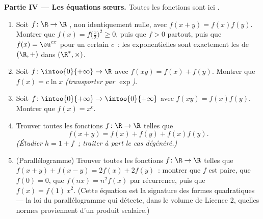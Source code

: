 \begin{problem}[{Devoir maison --- $f(x + y) = f(x) + f(y)$~:
la régularité force la linéarité, et le portrait des monstres}]
\medskip
\noindent\textbf{Partie IV --- Les équations sœurs.} Toutes les
fonctions sont ici .
\begin{enumerate}[resume]
  \item Soit $f \colon \R \to \R$ , non identiquement
        nulle, avec $f(x + y) = f(x)f(y)$. Montrer que $f(x) =
        f\bigl(\frac x2\bigr)^2 \geq 0$, puis que $f > 0$ partout,
        puis que $f(x) = \eu^{cx}$ pour un certain $c$~: les
        exponentielles sont exactement les   de
        $(\R, +)$ dans $(\R^*, \times)$.
  \item Soit $f \colon \intoo{0}{+\infty} \to \R$  avec
        $f(xy) = f(x) + f(y)$. Montrer que $f(x) = c\ln x$
        \emph{(transporter par $\exp$)}.
  \item Soit $f \colon \intoo{0}{+\infty} \to \intoo{0}{+\infty}$
         avec $f(xy) = f(x)f(y)$. Montrer que $f(x) = x^c$.
  \item Trouver toutes les fonctions  $f \colon \R \to \R$
        telles que
        \[
        f(x + y) = f(x) + f(y) + f(x)f(y) .
        \]
        \emph{(Étudier $h = 1 + f$~; traiter à part le cas
        dégénéré.)}
  \item (Parallélogramme) Trouver toutes les fonctions 
        $f \colon \R \to \R$ telles que $f(x + y) + f(x - y) =
        2f(x) + 2f(y)$~: montrer que $f$ est paire, que $f(0) = 0$,
        que $f(nx) = n^2 f(x)$ par récurrence, puis que $f(x) =
        f(1)\,x^2$. (Cette équation est la signature des formes
        quadratiques --- la loi du parallélogramme qui détecte,
        dans le volume de Licence 2, quelles normes proviennent
        d'un produit scalaire.)
\end{enumerate}


\end{problem}
